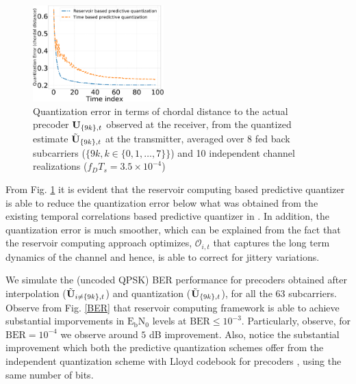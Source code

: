 \documentclass[conference]{IEEEtran}
\begin{document}
\begin{figure}[h]
\centering
\includegraphics[width=0.45\textwidth]{images/qtizErr.pdf}
\caption{Quantization error in terms of chordal distance to the actual precoder ${\bf U}_{\{9k\},t}$ observed at the receiver, from the quantized estimate $\tilde{{\bf U}}_{\{9k\},t}$ at the transmitter, averaged over 8 fed back subcarriers ($\{9k, k \in \{0,1,\ldots,7\}\}$) and 10 independent channel realizations ($f_DT_s=3.5\times10^{-4}$)}
\label{qtiz_err}
\end{figure}

From Fig. \ref{qtiz_err} it is evident that the reservoir computing based predictive quantizer is able to reduce the quantization error below what was obtained from the existing temporal correlations based predictive quantizer in \cite{6891198}. In addition, the quantization error is much smoother, which can be explained from the fact that the reservoir computing approach optimizes, $\mathcal{O}_{i,t}$ that captures the long term dynamics of the channel and hence, is able to correct for jittery variations.

We simulate the (uncoded QPSK) BER performance for precoders obtained after interpolation ($\tilde{{\bf U}}_{i\neq\{9k\},t}$) and quantization ($\tilde{{\bf U}}_{\{9k\},t}$), for all the 63 subcarriers. Observe from Fig. \ref{BER} that reservoir computing framework is able to achieve substantial imporvements in $\text{E}_\text{b}\text{N}_0$ levels at $\text{BER}\leq 10^{-3}$. Particularly, observe, for $\text{BER}=10^{-4}$ we observe around $5$ dB improvement. Also, notice the substantial improvement which both the predictive quantization schemes offer from the independent quantization scheme with Lloyd codebook for precoders \cite{6678348}, using the same number of bits.
\end{document}
